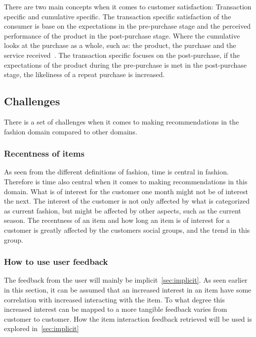 There are two main concepts when it comes to customer satisfaction: Transaction
specific and cumulative specific.  The transaction specific satisfaction of the
consumer is base on the expectations in the pre-purchase stage and the
perceived performance of the product in the post-purchase stage.  Where the
cumulative looks at the purchase as a whole, such as: the product, the purchase
and the service received~\cite{kumari2012}.  The transaction specific focuses
on the post-purchase, if the expectations of the product during the
pre-purchase is met in the post-purchase stage, the likeliness of a repeat
purchase is increased.

\subsection{Challenges}

There is a set of challenges when it comes to making recommendations in the
fashion domain compared to other domains.

\subsubsection{Recentness of items}

As seen from the different definitions of fashion, time is central in fashion.
Therefore is time also central when it comes to making recommendations in this
domain.  What is of interest for the customer one month might not be of
interest the next.  The interest of the customer is not only affected by what
is categorized as current fashion, but might be affected by other aspects, such
as the current season.  The recentness of an item and how long an item is of
interest for a customer is greatly affected by the customers social groups, and
the trend in this group.

\subsubsection{How to use user feedback}
The feedback from the user will mainly be implicit~\ref{sec:implicit}.  As seen
earlier in this section, it can be assumed that an increased interest in an
item have some correlation with increased interacting with the item.  To what
degree this increased interest can be mapped to a more tangible feedback
varies from customer to customer.
How the item interaction feedback retrieved will be used is explored in~\ref{sec:implicit}



